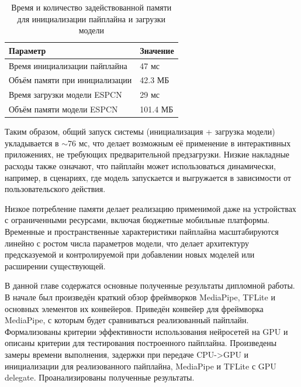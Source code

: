 \documentclass[a4paper,14pt]{extreport}
\begin{document}
            \begin{table}[h!]
                \centering
                \caption{Время и количество задействованной памяти для инициализации пайплайна и загрузки модели}
                \vspace*{10pt}
                \begin{tabular}{|l|l|}
                    \hline
                    Параметр & Значение \\
                    \hline
                    Время инициализации пайплайна  & 47 мс \\
                    Объём памяти при инициализации & 42.3 МБ \\
                    Время загрузки модели ESPCN    & 29 мс \\
                    Объём памяти модели ESPCN      & 101.4 МБ \\
                    \hline
                \end{tabular}
            \end{table}

            Таким образом, общий запуск системы (инициализация + загрузка модели) укладывается в $\sim 76$ мс, что делает возможным её применение в интерактивных приложениях, не требующих предварительной предзагрузки. Низкие накладные расходы также означают, что пайплайн может использоваться динамически, например, в сценариях, где модель запускается и выгружается в зависимости от пользовательского действия.

            Низкое потребление памяти делает реализацию применимой даже на устройствах с ограниченными ресурсами, включая бюджетные мобильные платформы. Временные и пространственные характеристики пайплайна масштабируются линейно с ростом числа параметров модели, что делает архитектуру предсказуемой и контролируемой при добавлении новых моделей или расширении существующей.

            В данной главе содержатся основные полученные результаты дипломной работы. В начале был произведён краткий обзор фреймворков MediaPipe, TFLite и основных элементов их конвейеров. Приведён конвейер для фреймворка MediaPipe, с которым будет сравниваться реализованный пайплайн. Формализованы критерии эффективности использования нейросетей на GPU и описаны критерии для тестирования построенного пайплайна. Произведены замеры времени выполнения, задержки при передаче CPU->GPU и инициализации для реализованного пайплайна, MediaPipe и TFLite с GPU delegate. Проанализированы полученные результаты.
            
\end{document}
